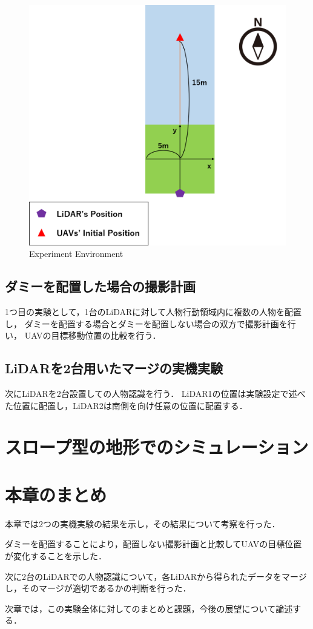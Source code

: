 \documentclass[autodetect-engine,dvipdfmx-if-dvi,ja=standard,a4j,jbase=11pt,magstyle=nomag*]{bxjsreport}
\begin{document}
\begin{figure}[t]
    \centering
    \includegraphics[width=\linewidth, clip]{./figure/chapter5/setting.png}
    \caption{Experiment Environment}
    \label{fig:envi}
\end{figure}

\subsection{ダミーを配置した場合の撮影計画}
1つ目の実験として，1台のLiDARに対して人物行動領域内に複数の人物を配置し，
ダミーを配置する場合とダミーを配置しない場合の双方で撮影計画を行い，
UAVの目標移動位置の比較を行う．

\subsection{LiDARを2台用いたマージの実機実験}
次にLiDARを2台設置しての人物認識を行う．
LiDAR1の位置は実験設定で述べた位置に配置し，LiDAR2は南側を向け任意の位置に配置する．

\section{スロープ型の地形でのシミュレーション}



\section{本章のまとめ}
本章では2つの実機実験の結果を示し，その結果について考察を行った．

ダミーを配置することにより，配置しない撮影計画と比較してUAVの目標位置が変化することを示した．

次に2台のLiDARでの人物認識について，各LiDARから得られたデータをマージし，そのマージが適切であるかの判断を行った．

次章では，この実験全体に対してのまとめと課題，今後の展望について論述する．
\end{document}

